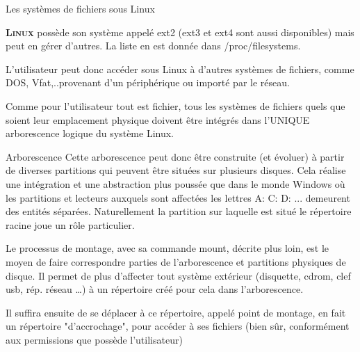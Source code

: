 \documentclass[10pt]{beamer}
\newcommand{\linux}{\textbf{\textsc{Linux}}\xspace}
\begin{document}
\begin{frame}{Les systèmes de fichiers sous Linux}

\linux possède son système appelé \alert{ext2} (\alert{ext3} et \alert{ext4} sont aussi disponibles) mais peut en gérer d'autres. La liste en est donnée dans /proc/filesystems.

L'utilisateur peut donc accéder sous Linux à d'autres systèmes de fichiers, comme DOS, Vfat,..provenant d'un périphérique ou importé par le réseau.

Comme pour l'utilisateur tout est fichier, tous les systèmes de fichiers quels que
soient leur emplacement physique doivent être intégrés dans l'UNIQUE arborescence logique du système Linux.
\end{frame}

\begin{frame}{Arborescence}
Cette arborescence peut donc être construite (et évoluer) à partir de diverses partitions qui   peuvent être situées sur plusieurs disques. Cela réalise une intégration et une abstraction plus poussée que dans le monde Windows où les partitions et lecteurs auxquels sont affectées les lettres A: C: D: ... demeurent des entités séparées. Naturellement la partition sur laquelle est situé le répertoire racine joue un rôle particulier.

Le processus de montage, avec sa commande \alert{mount}, décrite plus loin, est le moyen de faire correspondre parties de l'arborescence et partitions physiques de disque. Il permet de plus d'affecter tout système extérieur (disquette, cdrom,
clef usb, rép. réseau \ldots) à un répertoire créé pour cela dans l'arborescence.

Il suffira ensuite de se déplacer à ce répertoire, appelé point de montage, en fait un répertoire "d'accrochage", pour accéder à ses fichiers (bien sûr, conformément aux permissions que possède l'utilisateur)
\end{frame}
\end{document}

